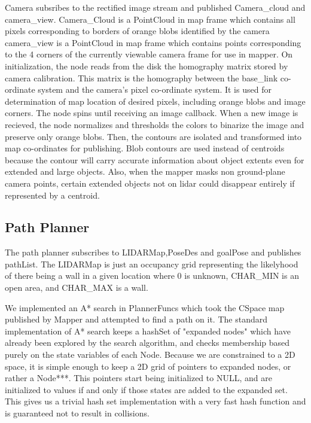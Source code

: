 \documentclass{article}
\begin{document}
Camera subsribes to the rectified image stream and published Camera\_cloud and camera\_view.
Camera\_Cloud is a PointCloud in map frame which contains all pixels corresponding to borders of orange blobs identified by the camera
camera\_view is a PointCloud in map frame which contains points corresponding to the 4 corners of the currently viewable camera frame for use in mapper.
On initialization, the node reads from the disk the homography matrix stored by camera calibration.  This matrix is the homography between the base\_link co-ordinate system and the camera's pixel co-ordinate system.  It is used for determination of map location of desired pixels, including orange blobs and image corners.
The node spins until receiving an image callback.  When a new image is recieved, the node normalizes and thresholds the colors to binarize the image and preserve only orange blobs.  Then, the contours are isolated and transformed into map co-ordinates for publishing.  Blob contours are used instead of centroids because the contour will carry accurate information about object extents even for extended and large objects.  Also, when the mapper masks non ground-plane camera points, certain extended objects not on lidar could disappear entirely if represented by a centroid.

\subsection{Path Planner}

The path planner subscribes to LIDARMap,PoseDes and goalPose and publishes pathList.  
The LIDARMap is just an occupancy grid representing the likelyhood of there being a wall in a given location where 0 is unknown, CHAR\_MIN is an open area, and CHAR\_MAX is a wall.

We implemented an A* search in PlannerFuncs which took the CSpace map published by Mapper and attempted to find a path on it.
The standard implementation of A* search keeps a hashSet of "expanded nodes" which have already been explored by the search algorithm, and checks membership based purely on the state variables of each Node.  
Because we are constrained to a 2D space, it is simple enough to keep a 2D grid of pointers to expanded nodes, or rather a Node***. 
This pointers start being initialized to NULL, and are initialized to values if and only if those states are added to the expanded set.
This gives us a trivial hash set implementation with a very fast hash function and is guaranteed not to result in collisions.
\end{document}
